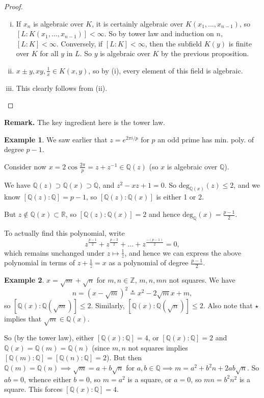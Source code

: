 \documentclass{article}
\theoremstyle{definition}
\newtheorem{example}{Example}[section]
\begin{document}
\begin{proof}
    \begin{enumerate}[(i)]
        \item If $x_n$ is algebraic over $K$, it is certainly algebraic over $K(x_1,\ldots,x_{n-1})$, so $[L : K(x_1,\ldots,x_{n-1})] < \infty$. So by tower law and induction on $n$, $[L:K] < \infty$. Conversely, if $[L:K] < \infty$, then the subfield $K(y)$ is finite over $K$ for all $y$ in $L$. So $y$ is algebraic over $K$ by the previous proposition. 
        \item $x \pm y, xy, \frac{1}{x} \in K(x,y)$, so by (i), every element of this field is algebraic.
        \item This clearly follows from (ii).
    \end{enumerate}
\end{proof}
\textbf{Remark.} The key ingredient here is the tower law.


\begin{example}
We saw earlier that $z = e^{2 \pi i /p}$ for $p$ an odd prime has min. poly. of degree $p-1$.

Consider now $x = 2\cos\frac{2\pi}{p} = z + z^{-1} \in \mathbb{Q}(z)$ (so $x$ is algebraic over $\mathbb{Q}$).

We have $\mathbb{Q}(z) \supset \mathbb{Q}(x) \supset \mathbb{Q}$, and $z^2-xz+1 = 0$. So $\text{deg}_{\mathbb{Q}(x)}(z) \le 2$, and we know $[\mathbb{Q}(z) : \mathbb{Q}] = p-1$, so $[\mathbb{Q}(z) : \mathbb{Q}(x)]$ is either 1 or 2.

But $z \not\in \mathbb{Q}(x) \subset \mathbb{R}$, so $[\mathbb{Q}(z) : \mathbb{Q}(x)] = 2$ and hence $\text{deg}_{\mathbb{Q}}(x) = \frac{p-1}{2}$.

To actually find this polynomial, write $$z^{\frac{p-1}{2}}+z^{\frac{p-3}{2}} + \ldots + z^{\frac{-(p-1)}{2}} = 0,$$ which remains unchanged under $z \mapsto \frac{1}{z}$, and hence we can express the above polynomial in terms of $z + \frac{1}{z} = x$ as a polynomial of degree $\frac{p-1}{2}$.
\end{example}
\begin{example}
    $x = \sqrt{m} + \sqrt{n}$ for $m,n \in \mathbb{Z}$, $m,n,mn$ not squares. We have \[
    n = (x - \sqrt{m})^2 \stackrel{\star}{=}  x^2 - 2\sqrt{m}x + m
    ,\] so $[\mathbb{Q}(x) : \mathbb{Q}(\sqrt{m})] \le 2$. Similarly, $[\mathbb{Q}(x) : \mathbb{Q}(\sqrt{n})] \le 2$. Also note that $\star$ implies that $\sqrt{m} \in \mathbb{Q}(x)$.
    
    So (by the tower law), either $[\mathbb{Q}(x):\mathbb{Q}]=4$, or $[\mathbb{Q}(x):\mathbb{Q}]=2$ and $\mathbb{Q}(x)=\mathbb{Q}(m)=\mathbb{Q}(n)$ (since $m,n$ not squares implies $[\mathbb{Q}(m): \mathbb{Q}] = [\mathbb{Q}(n): \mathbb{Q}] = 2$). But then $\mathbb{Q}(m)=\mathbb{Q}(n) \implies \sqrt{m}=a+b\sqrt{n}$ for $a,b \in \mathbb{Q} \implies m = a^2 + b^2 n + 2ab \sqrt{n}$. So $ab=0$, whence either $b=0$, so $m=a^2$ is a square, or $a=0$, so $mn=b^2n^2$ is a square. This forces $[\mathbb{Q}(x): \mathbb{Q}] = 4$.
\end{example}
\end{document}
